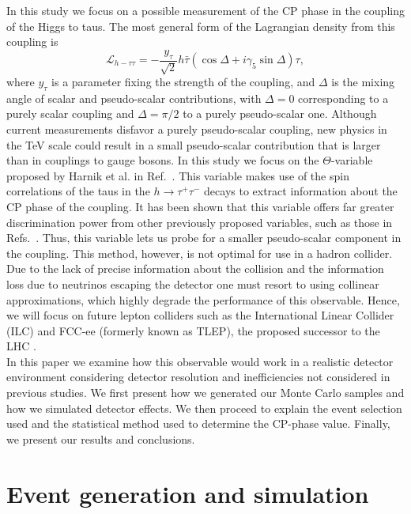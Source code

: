 \documentclass[preprintnumbers,nofootinbib,noshowpacs,eqsecnum,prd,superscriptaddress,letterpaper]{revtex4}
\begin{document}
In this study we focus on a possible measurement of the CP phase in the coupling of the Higgs to taus. The most general form of the Lagrangian density from this coupling is
\begin{equation}
\mathcal{L}_{h-\tau\tau}=-\frac{y_\tau}{\sqrt{2}}h\bar{\tau}(\cos\Delta+i\gamma_5\sin\Delta)\tau,\label{eqn:lagrangian}
\end{equation}
where $y_\tau$ is a parameter fixing the strength of the coupling, and $\Delta$ is the mixing angle of scalar and pseudo-scalar contributions, with $\Delta=0$ corresponding to a purely scalar coupling and $\Delta=\pi/2$ to a purely pseudo-scalar one. Although current measurements disfavor a purely pseudo-scalar coupling, new physics in the TeV scale could result in a small pseudo-scalar contribution that is larger than in couplings to gauge bosons\cite{harnik}. In this study we focus on the $\Theta$-variable proposed by Harnik et al. in Ref.~\cite{harnik}. This variable makes use of the spin correlations of the taus in the $h\rightarrow\tau^+\tau^-$ decays to extract information about the CP phase of the coupling. It has been shown that this variable offers far greater discrimination power from other previously proposed variables, such as those in Refs.~\cite{worek,berge}. Thus, this variable lets us probe for a smaller pseudo-scalar component in the coupling. This method, however, is not optimal for use in a hadron collider. Due to the lack of precise information about the collision and the information loss due to neutrinos escaping the detector one must resort to using collinear approximations, which highly degrade the performance of this observable. Hence, we will focus on future lepton colliders such as the International Linear Collider (ILC) \cite{ilc} and FCC-ee (formerly known as TLEP), the proposed successor to the LHC \cite{fccee}.\\

In this paper we examine how this observable would work in a realistic detector environment considering detector resolution and inefficiencies not considered in previous studies. We first present how we generated our Monte Carlo samples and how we simulated detector effects. We then proceed to explain the event selection used and the statistical method used to determine the CP-phase value. Finally, we present our results and conclusions.

\section{Event generation and simulation}
\label{sec:samples}
\end{document}
